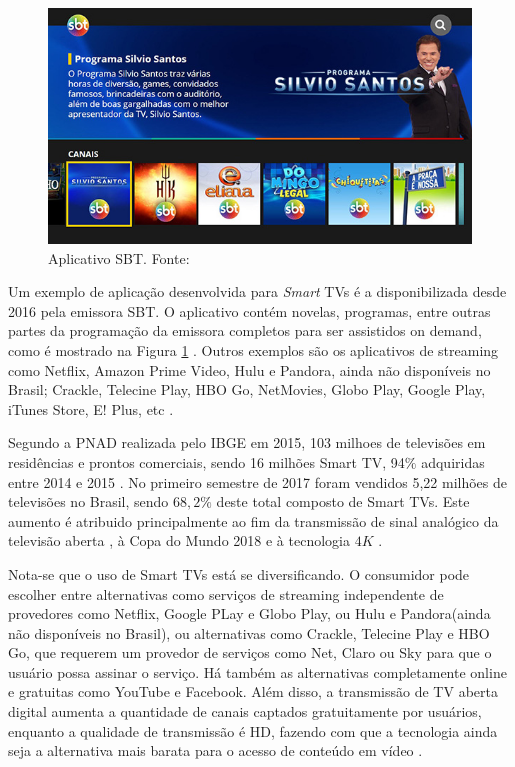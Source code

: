 \begin{figure}[ht]
	\includegraphics[width=\textwidth]{img/sbt_app.jpg}
	\caption{Aplicativo SBT. Fonte: \cite{sbt:tvconectada}}
	\label{fig:sbt_app}
\end{figure}

Um exemplo de aplicação desenvolvida para \emph{Smart} TVs é a disponibilizada desde 2016 pela emissora SBT. O aplicativo contém novelas, programas, entre outras partes da programação da emissora completos para ser assistidos on demand, como é mostrado na Figura \ref{fig:sbt_app} \cite{sbt:tvconectada}. Outros exemplos são os aplicativos de streaming como Netflix, Amazon Prime Video, Hulu e Pandora, ainda não disponíveis no Brasil; Crackle, Telecine Play, HBO Go, NetMovies, Globo Play, Google Play, iTunes Store, E! Plus, etc \cite{canaltech:streaming}.

Segundo a PNAD realizada pelo IBGE em 2015, 103 milhoes de televisões em residências e prontos comerciais, sendo 16 milhões Smart TV, 94$\%$ adquiridas entre 2014 e 2015 \cite{pnad2015}. No primeiro semestre de 2017 foram vendidos 5,22 milhões de televisões no Brasil, sendo $68,2\%$ deste total composto de Smart TVs. Este aumento é atribuido principalmente ao fim da transmissão de sinal analógico da televisão aberta \cite{leiajabuscasmart}, à Copa do Mundo 2018 e à tecnologia $4K$ \cite{correiopnad}.

Nota-se que o uso de Smart TVs está se diversificando. O consumidor pode escolher entre alternativas como serviços de streaming independente de provedores como Netflix, Google PLay e Globo Play, ou Hulu e Pandora(ainda não disponíveis no Brasil), ou alternativas como Crackle, Telecine Play e HBO Go, que requerem um provedor de serviços como Net, Claro ou Sky para que o usuário possa assinar o serviço. Há também as alternativas completamente online e gratuitas como YouTube e Facebook. Além disso, a transmissão de TV aberta digital aumenta a quantidade de canais captados gratuitamente por usuários, enquanto a qualidade de transmissão é HD, fazendo com que a tecnologia ainda seja a alternativa mais barata para o acesso de conteúdo em vídeo \cite{estadao:explosaovideosonline} \cite{tomsguid:everythingsmart}.
